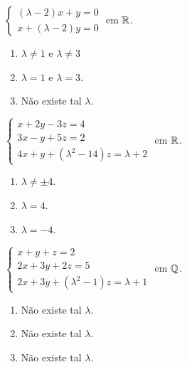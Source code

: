 \documentclass[12pt]{exam}
\begin{document}
\begin{exercicio}
  $
    \begin{cases}
      (\lambda - 2)x + y = 0\\
      x + (\lambda - 2)y = 0
    \end{cases}
  $
  em $\mathbb{R}$.
  \begin{solucao}
    \begin{enumerate}[label={\alph*})]
      \item $\lambda \ne 1$ e $\lambda \ne 3$
      \item $\lambda = 1$ e $\lambda = 3$.
      \item N\~ao existe tal $\lambda$.
    \end{enumerate}
  \end{solucao}
\end{exercicio}

\begin{exercicio}
  $
    \begin{cases}
      x + 2y - 3z = 4\\
      3x - y + 5z = 2\\
      4x + y + (\lambda^2 - 14)z = \lambda + 2
    \end{cases}
  $
  em $\mathbb{R}$.
  \begin{solucao}
    \begin{enumerate}[label={\alph*})]
      \item $\lambda \ne \pm 4$.
      \item $\lambda = 4$.
      \item $\lambda = -4$.
    \end{enumerate}
  \end{solucao}
\end{exercicio}

\begin{exercicio}
  $
    \begin{cases}
      x + y + z = 2\\
      2x + 3y + 2z = 5\\
      2x + 3y + (\lambda^2 - 1)z = \lambda + 1
    \end{cases}
  $
  em $\mathbb{Q}$.
  \begin{solucao}
    \begin{enumerate}[label={\alph*})]
      \item N\~ao existe tal $\lambda$.
      \item N\~ao existe tal $\lambda$.
      \item N\~ao existe tal $\lambda$.
    \end{enumerate}
  \end{solucao}
\end{exercicio}
\end{document}
